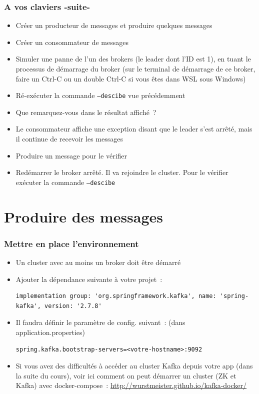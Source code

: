 \documentclass{beamer}
\begin{document}
\begin{frame}[fragile]
	\frametitle{A vos claviers -suite-}
	\begin{itemize}		
		\item Créer un producteur de messages et produire quelques messages
		\item Créer un consommateur de messages
		\item Simuler une panne de l'un des brokers (le leader dont l'ID est 1), en tuant le processus de démarrage du broker (sur le terminal de démarrage de ce broker, faire un Ctrl-C ou un double Ctrl-C si vous êtes dans WSL sous Windows)
		\item Ré-exécuter la commande \texttt{---descibe} vue précédemment
		\item Que remarquez-vous dans le résultat affiché~?
		\item Le consommateur affiche une exception disant que le leader s'est arrêté, mais il continue de recevoir les messages		
		\item Produire un message pour le vérifier
		\item Redémarrer le broker arrêté. Il va rejoindre le cluster. Pour le vérifier exécuter la commande \texttt{---descibe}
	\end{itemize}
\end{frame} 

\section{Produire des messages}

\begin{frame}[fragile]
	\frametitle{Mettre en place l'environnement}
	\begin{itemize}
		\item Un cluster avec au moins un broker doit être démarré
		
		\item Ajouter la dépendance suivante à votre projet~:
\begin{lstlisting}
implementation group: 'org.springframework.kafka', name: 'spring-kafka', version: '2.7.8'
\end{lstlisting}
		\item Il faudra définir le paramètre de config. suivant~: (dans application.properties)
\begin{lstlisting}
spring.kafka.bootstrap-servers=<votre-hostname>:9092
\end{lstlisting}
	\item Si vous avez des difficultés à accéder au cluster Kafka depuis votre app (dans la suite du cours), voir ici comment on peut démarrer un cluster (ZK et Kafka) avec docker-compose~: \url{http://wurstmeister.github.io/kafka-docker/}
	\end{itemize}
\end{frame} 
\end{document}
